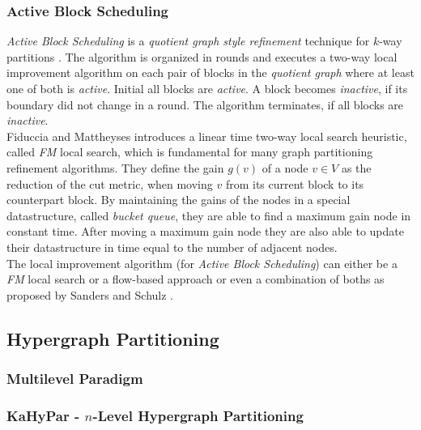 \subsubsection{Active Block Scheduling}
\label{sec:abs}
\emph{Active Block Scheduling} is a \emph{quotient graph style refinement} technique for
$k$-way partitions \cite{holtgrewe2010engineering,sanders2011engineering}. 
The algorithm is organized in rounds and executes a two-way 
local improvement algorithm on each pair of 
blocks in the \emph{quotient graph} where at least one of both is \emph{active}. 
Initial all blocks are \emph{active}. A block becomes \emph{inactive}, 
if its boundary did not change in a round. The algorithm
terminates, if all blocks are \emph{inactive}. \\
Fiduccia and Mattheyses \cite{fiduccia1988linear} introduces a linear time
two-way local search heuristic, called \emph{FM} local search, 
which is fundamental for many graph partitioning refinement algorithms.
They define the gain $g(v)$ of a node $v \in V$ as the reduction of the cut metric, when
moving $v$ from its current block to its counterpart block. By maintaining the gains of the
nodes in a special datastructure, called \emph{bucket queue}, they are able to find a maximum
gain node in constant time. After moving a maximum gain node they are also able to update their
datastructure in time equal to the number of adjacent nodes.\\
The local improvement algorithm (for \emph{Active Block Scheduling}) can either 
be a \emph{FM} local search or a flow-based approach or even a combination of 
boths as proposed by Sanders and Schulz \cite{sanders2011engineering}. \\



\subsection{Hypergraph Partitioning}

\subsubsection{Multilevel Paradigm}

\subsubsection{KaHyPar - $n$-Level Hypergraph Partitioning}
\label{sec:kahypar}